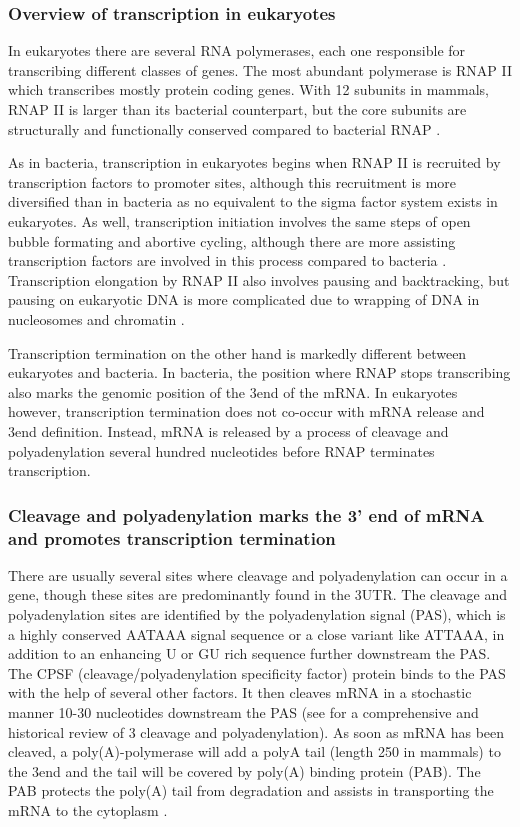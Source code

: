 %
\subsubsection{Overview of transcription in eukaryotes}
In eukaryotes there are several RNA polymerases, each one responsible for
transcribing different classes of genes. The most abundant polymerase is 
RNAP II which transcribes mostly protein coding genes. With 12 subunits in
mammals, RNAP II is larger than its bacterial counterpart, but the core
subunits are structurally and functionally conserved compared to bacterial RNAP
\cite{ebright_rna_2000}.

As in bacteria, transcription in eukaryotes begins when RNAP II is recruited by
transcription factors to promoter sites, although this recruitment is more
diversified than in bacteria as no equivalent to the sigma factor system
exists in eukaryotes. As well, transcription initiation involves the same steps
of open bubble formating and abortive cycling, although there are more
assisting transcription factors are involved in this process compared to
bacteria \cite{wade_transition_2008}. Transcription elongation by RNAP II also
involves pausing and backtracking, but pausing on eukaryotic DNA is more
complicated due to wrapping of DNA in nucleosomes and chromatin
\cite{sims_elongation_2004}.

Transcription termination on the other hand is markedly different between
eukaryotes and bacteria. In bacteria, the position where RNAP stops
transcribing also marks the genomic position of the 3\p end of the mRNA. In
eukaryotes however, transcription termination does not co-occur with mRNA
release and 3\p end definition. Instead, mRNA is released by a process of
cleavage and polyadenylation several hundred nucleotides before RNAP terminates
transcription.

\subsubsection{Cleavage and polyadenylation marks the 3' end of mRNA
and promotes transcription termination}
There are usually several sites where cleavage and polyadenylation can occur in
a gene, though these sites are predominantly found in the 3\p UTR. The cleavage
and polyadenylation sites are identified by the polyadenylation signal (PAS),
which is a highly conserved AATAAA signal sequence or a close variant like
ATTAAA, in addition to an enhancing U or GU rich sequence further downstream
the PAS. The CPSF (cleavage/polyadenylation specificity factor) protein binds
to the PAS with the help of several other factors. It then cleaves mRNA in a
stochastic manner 10-30 nucleotides downstream the PAS (see
\cite{proudfoot_ending_2011} for a comprehensive and historical review of 3\p
cleavage and polyadenylation). As soon as mRNA has been cleaved, a
poly(A)-polymerase will add a polyA tail (length 250 in mammals) to the 3\p end
and the tail will be covered by poly(A) binding protein (PAB). The PAB protects
the poly(A) tail from degradation and assists in transporting the mRNA to the
cytoplasm \cite{mangus_poly-binding_2003}.

